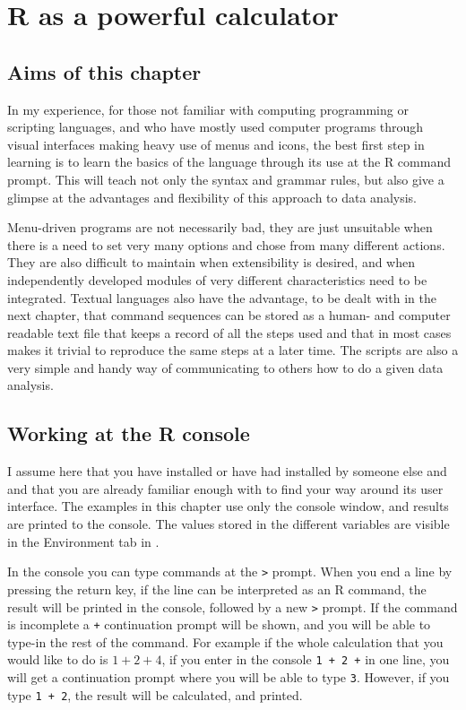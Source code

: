 \documentclass[paper=a4,10pt,div=17,headsepline,BCOR=12mm,twoside,open=right]{scrbook}\usepackage{knitr}
\begin{document}
\mainmatter





\chapter{R as a powerful calculator}\label{chap:R:as:calc}

\section{Aims of this chapter}

In my experience, for those not familiar with computing programming or scripting languages, and who have mostly used computer programs through visual interfaces making heavy use of menus and icons, the best first step in learning \R is to learn the basics of the language through its use at the R command prompt. This will teach not only the syntax and grammar rules, but also give a glimpse at the advantages and flexibility of this approach to data analysis.

Menu-driven programs are not necessarily bad, they are just unsuitable when there is a need to set very many options and chose from many different actions. They are also difficult to maintain when extensibility is desired, and when independently developed modules of very different characteristics need to be integrated. Textual languages also have the advantage, to be dealt with in the next chapter, that command sequences can be stored as a human- and computer readable text file that keeps a record of all the steps used and that in most cases makes it trivial to reproduce the same steps at a later time. The scripts are also a very simple and handy way of communicating to others how to do a given data analysis.

\section{Working at the R console}

I assume here that you have installed or have had installed by someone else \R and \RStudio and that you are already familiar enough with \RStudio to find your way around its user interface. The examples in this chapter use only the console window, and results are printed to the console. The values stored in the different variables are visible in the Environment tab in \RStudio.

In the console you can type commands at the \texttt{>} prompt.
When you end a line by pressing the return key, if the line can be interpreted as an R command, the result will be printed in the console, followed by a new \texttt{>} prompt.
If the command is incomplete a \texttt{+} continuation prompt will be shown, and you will be able to type-in the rest of the command. For example if the whole calculation that you would like to do is $1 + 2 + 4$, if you enter in the console \texttt{1 + 2 +} in one line, you will get a continuation prompt where you will be able to type \texttt{3}. However, if you type \texttt{1 + 2}, the result will be calculated, and printed.
\end{document}
